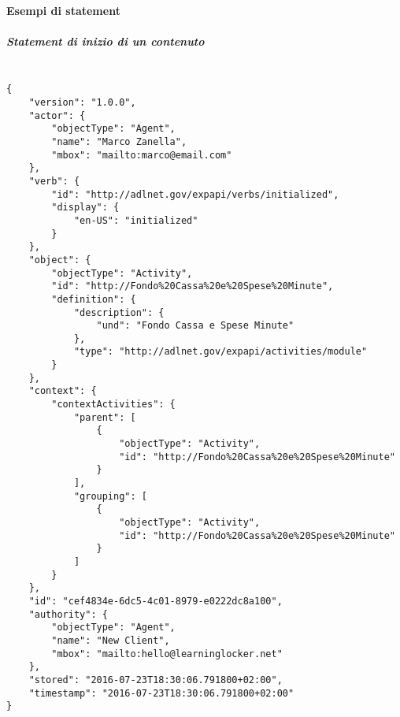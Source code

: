 \paragraph{Esempi di statement}
    \subparagraph*{Statement di inizio di un contenuto\\\\}
    \begin{lstlisting}
{
    "version": "1.0.0",
    "actor": {
        "objectType": "Agent",
        "name": "Marco Zanella",
        "mbox": "mailto:marco@email.com"
    },
    "verb": {
        "id": "http://adlnet.gov/expapi/verbs/initialized",
        "display": {
            "en-US": "initialized"
        }
    },
    "object": {
        "objectType": "Activity",
        "id": "http://Fondo%20Cassa%20e%20Spese%20Minute",
        "definition": {
            "description": {
                "und": "Fondo Cassa e Spese Minute"
            },
            "type": "http://adlnet.gov/expapi/activities/module"
        }
    },
    "context": {
        "contextActivities": {
            "parent": [
                {
                    "objectType": "Activity",
                    "id": "http://Fondo%20Cassa%20e%20Spese%20Minute"
                }
            ],
            "grouping": [
                {
                    "objectType": "Activity",
                    "id": "http://Fondo%20Cassa%20e%20Spese%20Minute"
                }
            ]
        }
    },
    "id": "cef4834e-6dc5-4c01-8979-e0222dc8a100",
    "authority": {
        "objectType": "Agent",
        "name": "New Client",
        "mbox": "mailto:hello@learninglocker.net"
    },
    "stored": "2016-07-23T18:30:06.791800+02:00",
    "timestamp": "2016-07-23T18:30:06.791800+02:00"
}
    \end{lstlisting}

